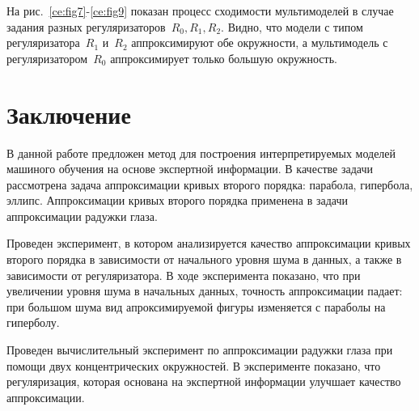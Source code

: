 \documentclass[12pt, twoside]{article}
\numberwithin{equation}{section}
\begin{document}
На рис.~\ref{ce:fig7}-\ref{ce:fig9} показан процесс сходимости мультимоделей в случае задания разных регуляризаторов~$R_0,R_1,R_2$. Видно, что модели с типом регуляризатора~$R_1$ и~$R_2$ аппроксимируют обе окружности, а мультимодель с регуляризатором~$R_0$ аппроксимирует только большую окружность.


\section{Заключение}
В данной работе предложен метод для построения интерпретируемых моделей машиного обучения на основе экспертной информации. В качестве задачи рассмотрена задача аппроксимации кривых второго порядка: парабола, гипербола, эллипс. Аппроксимации кривых второго порядка применена в задачи аппроксимации радужки глаза.

Проведен эксперимент, в котором анализируется качество аппроксимации кривых второго порядка в зависимости от начального уровня шума в данных, а также в зависимости от регуляризатора. В ходе эксперимента показано, что при увеличении уровня шума в начальных данных, точность аппроксимации падает: при большом шума вид апроксимируемой фигуры изменяется с параболы на гиперболу.

Проведен вычислительный эксперимент по аппроксимации радужки глаза при помощи двух концентрических окружностей. В эксперименте показано, что регуляризация, которая основана на экспертной информации улучшает качество аппроксимации.
\end{document}
